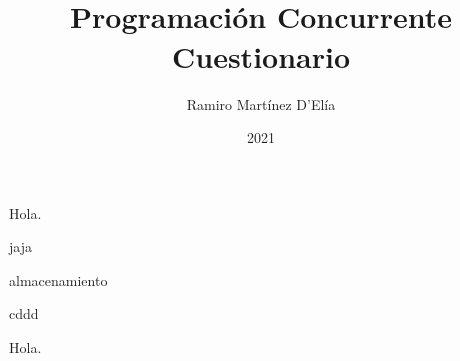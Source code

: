 \documentclass[a4paper, 10pt]{article}
\newenvironment{main_question}
    {\begin{enumerate}[resume=series-name]\bfseries}
    {\end{enumerate}}
\newenvironment{sub_questions}
    {\begin{enumerate}[label=\emph{\alph*}), leftmargin=0cm]}
    {\end{enumerate}}
\begin{document}
    
\title{
    \\
    Programación Concurrente\\
    \large Cuestionario
}

\author{Ramiro Martínez D'Elía}
\date{2021}
\maketitle

\begin{main_question}
\item Hola.
\begin{sub_questions}
\item jaja
\item almacenamiento
\item cddd
\end{sub_questions}
\end{main_question}

\begin{main_question}
\item Hola.    
\end{main_question}
\end{document}
